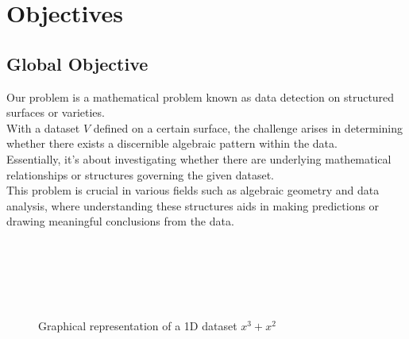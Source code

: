 \documentclass{report}
\begin{document}
\section{Objectives}
    \subsection{Global Objective}

        Our problem is a mathematical problem known 
        as data detection on structured surfaces or 
        varieties.  \\
        With a dataset $V$ 
        defined on a certain surface, the challenge 
        arises in determining whether there exists a 
        discernible algebraic pattern within the data. 
        \\ 
        Essentially, it's about investigating whether 
        there are underlying mathematical relationships 
        or structures governing the given dataset. 
        \\ 
        This problem is crucial in various fields 
        such as algebraic geometry and data analysis, 
        where understanding these structures aids in 
        making predictions or drawing meaningful 
        conclusions from the data.
        \\
        \\
        \\
        \\
        \\
        \\


        \begin{figure}[h]
        \centering
        \caption{Graphical representation of a 1D dataset $x^3 + x^2$ }
        \end{figure}
\end{document}
